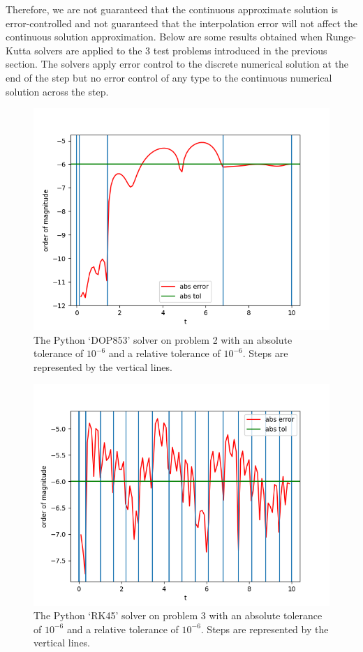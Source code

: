 Therefore, we are not guaranteed that the continuous approximate solution is error-controlled and not guaranteed that the interpolation error will not affect the continuous solution approximation. Below are some results obtained when Runge-Kutta solvers are applied to the 3 test problems introduced in the previous section. The solvers apply error control to the discrete numerical solution at the end of the step but no error control of any type to the continuous numerical solution across the step.

\begin{figure}[H]
\centering
\includegraphics[width=0.7\linewidth]{./figures/no_middle_step_error_control_p2_dop853}
\caption{The Python `DOP853' solver on problem 2 with an absolute tolerance of $10^{-6}$ and a relative tolerance of $10^{-6}$. Steps are represented by the vertical lines.}
\label{fig:no_middle_step_error_control_p2_dop853}
\end{figure}

\begin{figure}[H]
\centering
\includegraphics[width=0.7\linewidth]{./figures/no_middle_step_error_control_p3_rk45}
\caption{The Python `RK45' solver on problem 3 with an absolute tolerance of $10^{-6}$ and a relative tolerance of $10^{-6}$. Steps are represented by the vertical lines.}
\label{fig:no_middle_step_error_control_p3_rk45}
\end{figure}

